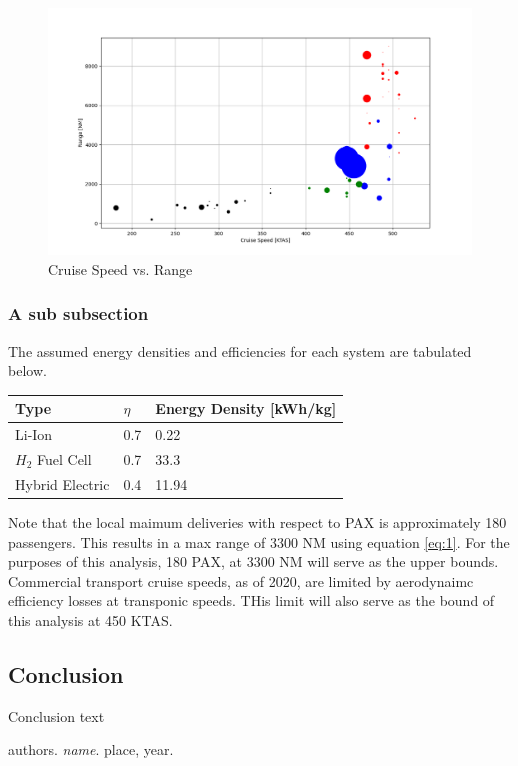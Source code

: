 \documentclass[12pt]{article} %
\begin{document}
\begin{figure}[h]
\begin{center}
\includegraphics[width=1\textwidth]{speed_v_range}
\end{center}
\caption{Cruise Speed vs. Range}
\end{figure}

\subsubsection{A sub subsection}

The assumed energy densities and efficiencies for each system are tabulated below.

\begin{center}
\begin{tabular}{ | m{3cm} | m{3cm}| m{3cm} | } 
\hline
Type& $\eta$ & Energy Density [kWh/kg]\\ 
\hline
Li-Ion& 0.7 & 0.22 \\ 
\hline
$H_{2}$ Fuel Cell & 0.7 & 33.3 \\ 
\hline
Hybrid Electric & 0.4 & 11.94 \\ 
\hline
\end{tabular}
\end{center}

Note that the local maimum deliveries with respect to PAX is approximately 180 passengers. This results in a max range of 3300 NM using equation \ref{eq:1}. For the purposes of this analysis, 180 PAX, at 3300 NM will serve as the upper bounds. Commercial transport cruise speeds, as of 2020, are limited by aerodynaimc efficiency losses at transponic speeds. THis limit will also serve as the bound of this analysis at 450 KTAS.

\subsection{Conclusion}

Conclusion text

\pagebreak

\begin{thebibliography}{9}
authors. 
\textit{name}. 
place, year.
\end{thebibliography}
\end{document}
